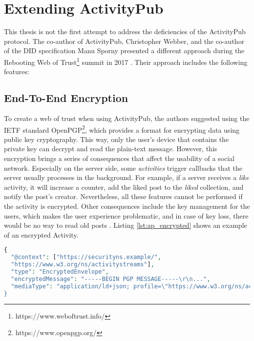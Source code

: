 \section{Extending ActivityPub}\label{sec:extending_activitypub}

This thesis is not the first attempt to address the deficiencies of the ActivityPub protocol. The co-author of ActivityPub, Christopher Webber, and the co-author of the DID specification Manu Sporny presented a different approach during the Rebooting Web of Trust\footnote{https://www.weboftrust.info/} summit in 2017 \cite{webber_sporny_2017}. Their approach includes the following features:

\subsection*{\textbf{End-To-End Encryption}}\label{subsec:e2e}

To create a web of trust when using ActivityPub, the authors suggested using the IETF standard OpenPGP\footnote{https://www.openpgp.org/}, which provides a format for encrypting data using public key cryptography. This way, only the user's device that contains the private key can decrypt and read the plain-text message. However, this encryption brings a series of consequences that affect the usability of a social network. Especially on the server side, some \emph{activities} trigger callbacks that the server usually processes in the background. For example, if a server receives a \emph{like} activity, it will increase a counter, add the liked post to the \emph{liked} collection, and notify the post's creator. Nevertheless, all these features cannot be performed if the activity is encrypted. Other consequences include the key management for the users, which makes the user experience problematic, and in case of key loss, there would be no way to read old posts \cite{webber_sporny_2017}. Listing \ref{lst:ap_encrypted} shows an example of an encrypted Activity.

\lstset{style=JSONStyle}
\begin{lstlisting}[language=PHP, caption=Note object with encrypted content \cite{webber_sporny_2017}, label=lst:ap_encrypted, float=h]
{
  "@context": ["https://securityns.example/",
  "https://www.w3.org/ns/activitystreams"],
  "type": "EncryptedEnvelope",
  "encryptedMessage": "-----BEGIN PGP MESSAGE-----\r\n...",
  "mediaType": "application/ld+json; profile=\"https://www.w3.org/ns/activitystreams\"
}
\end{lstlisting}

